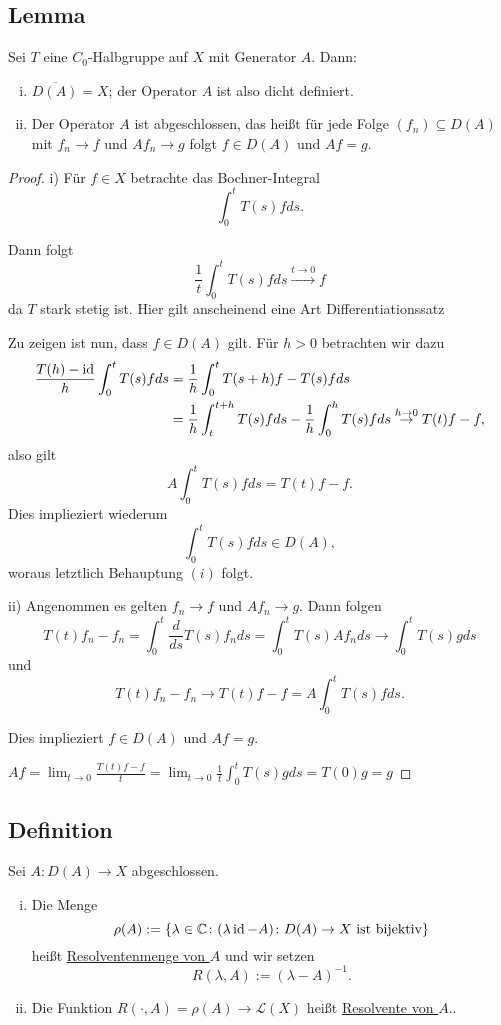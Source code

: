 \subsection{Lemma}

Sei $T$ eine $C_0$-Halbgruppe auf $X$ mit Generator $A$.
Dann:
\begin{enumerate}[i)]
  \item $\overline{D(A)} = X$; der Operator $A$ ist also dicht definiert.
  \item Der Operator $A$ ist abgeschlossen, das heißt für jede Folge $(f_n) \subseteq D(A)$ mit $f_n \to f$ und $Af_n \to g$ folgt $f \in D(A)$ und $A f = g$. 
\end{enumerate}

\begin{proof}
i) Für $f \in X$ betrachte das Bochner-Integral
$$
\int_0^t T(s) f ds.
$$

Dann folgt
$$
\frac{1}{t} \int_0^t T(s) f ds \overset{t \to 0}{\to} f
$$
da $T$ stark stetig ist. {\tiny{Hier gilt anscheinend eine Art Differentiationssatz}}

Zu zeigen ist nun, dass $f\in D(A)$ gilt.
Für $h > 0$ betrachten wir dazu
\begin{align*}
\frac{T(h) - \operatorname{id}}{h} \int_0^t T(s) f ds 
&= \frac{1}{h} \int_0^t T(s + h) f - T(s) f ds \\
&= \frac{1}{h} \int_t^{t + h} T(s) f ds - \frac{1}{h} \int_0^h T(s) f ds \overset{h \to 0}{\to} T(t) f - f,
\end{align*}
also gilt
$$A \int_0^t T(s) f ds = T(t) f - f.$$
Dies implieziert wiederum
$$\int_0^t T(s) f ds \in D(A),$$
woraus letztlich Behauptung $(i)$ folgt.

ii) Angenommen es gelten $f_n \to f$ und $A f_n \to g$.
Dann folgen
$$
T(t) f_n - f_n = \int_0^t \frac{d}{ds} T(s) f_n ds = \int_0^tT(s) Af_n ds \to \int_0^t T(s) g ds
$$
und
$$
T(t) f_n - f_n \to T(t) f - f = A \int_0^t T(s) f ds.
$$

Dies implieziert $f \in D(A)$ und $Af = g$.

{\tiny{$Af = \lim_{t \to 0} \frac{T(t) f - f}{t} = \lim_{t \to 0} \frac{1}{t} \int_0^t T(s) g ds = T(0) g = g$}}
\end{proof}

\subsection{Definition}

Sei $A \colon D(A) \to X$ abgeschlossen.
\begin{enumerate}[i)]
  \item Die Menge
  $$
    \rho(A) := \{ \lambda \in \mathbb{C} \colon (\lambda \operatorname{id} - A) \colon D(A) \to X \text{ ist bijektiv}\}
  $$
  heißt \underline{Resolventenmenge von $A$} und wir setzen
  $$
  R(\lambda, A) := (\lambda - A)^{-1}.
  $$ 
  \item Die Funktion $R(\cdot, A) = \rho(A) \to \mathcal{L}(X)$ heißt \underline{Resolvente von $A$}..
\end{enumerate}

